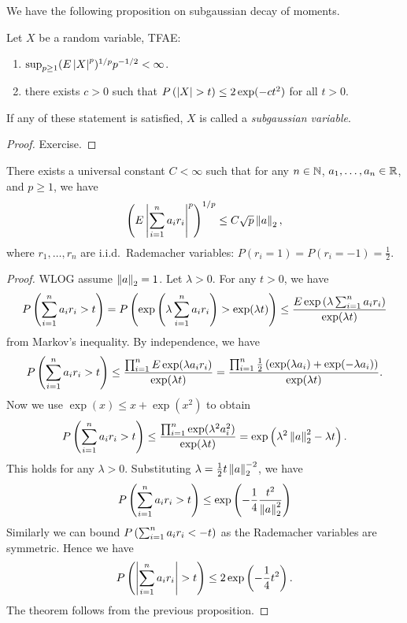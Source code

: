 \documentclass[a4paper]{article}
\begin{document}
We have the following proposition on subgaussian decay of moments.
\begin{prop}
  Let $X$ be a random variable, TFAE:
  \begin{enumerate}
    \item $\sup_{p \geq 1} (E \left\lvert X\right\rvert^p)^{1 / p} p^{-1/2} < \infty$.
    \item there exists $c > 0$ such that $P \left( \left\lvert X\right\rvert > t \right)
    \leq 2 \exp (-c t^2)$ for all $t > 0$.
  \end{enumerate}
  If any of these statement is satisfied, $X$ is called a \emph{subgaussian 
  variable}.
\end{prop}

\begin{proof}
  Exercise.

\end{proof}

\begin{thm}
  There exists a universal constant $C < \infty$ such that for any
  $n \in \mathbb{N}$, $a_1, \dots, a_n \in \mathbb{R}$, and $p \geq 1$, we have 
  \[
  \left( E \left\lvert \sum_{i=1}^n a_i r_i\right\rvert^p \right)^{1 / p} \leq 
  C \sqrt{p} \left\lVert a\right\rVert_2,
  \]
  where $r_1, \dots, r_n$ are i.i.d.\ Rademacher variables:
  $P \left( r_i = 1 \right) = P \left( r_i = -1 \right)
  = \frac{1}{2}$.
\end{thm}

\begin{proof}
  WLOG assume $\left\lVert a\right\rVert_2= 1$. Let $\lambda > 0$. For any $t > 0$, we have
  \begin{align*}
    P \left( \sum_{i=1}^n a_i r_i > t \right)
    = P \left( \exp \left( \lambda \sum_{i=1}^n a_i r_i \right)
    > \exp (\lambda t) \right)
    \leq \frac{E \exp \left( \lambda \sum_{i=1}^n a_i r_i \right)}
    {\exp (\lambda t)}
  \end{align*}
  from Markov's inequality. By independence, we have 
  \begin{align*}
    P \left( \sum_{i=1}^n a_i r_i > t \right)
    \leq \frac{\prod_{i=1}^{n} E \exp (\lambda a_i r_i) }{\exp (\lambda t)}
    = \frac{\prod_{i=1}^n \frac{1}{2} \left( \exp (\lambda a_i) + 
    \exp (- \lambda a_i) \right) }{\exp (\lambda t)}.
  \end{align*}
  Now we use $\exp (x) \leq x + \exp (x^2)$ to obtain
  \begin{align*}
    P \left( \sum_{i=1}^n a_i r_i > t \right)
    \leq \frac{\prod_{i=1}^n \exp (\lambda^2 a_i^2)}{\exp (\lambda t)} 
    = \exp \left( \lambda^2 \left\lVert a\right\rVert^2_2 - \lambda t \right).
  \end{align*}
  This holds for any $\lambda > 0$. Substituting $\lambda = 
  \frac{1}{2} t \left\lVert a\right\rVert^{-2}_2$, we have 
  \[
  P \left( \sum_{i=1}^n a_i r_i > t \right) \leq \exp \left( -\frac{1}{4} 
  \frac{t^2}{\left\lVert a\right\rVert^2_2} \right)
  \]
  Similarly we can bound $P \left( \sum_{i=1}^n a_i r_i < -t \right)$
  as the Rademacher variables are symmetric. Hence we have 
  \[
  P \left( \left\lvert \sum_{i=1}^n a_i r_i\right\rvert > t \right) \leq 2
  \exp \left( -\frac{1}{4} t^2 \right).
  \]
  The theorem follows from the previous proposition.

\end{proof}
\end{document}

